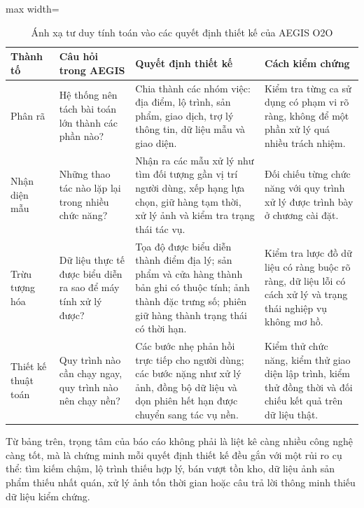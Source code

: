 \documentclass[12pt, a4paper]{article}
\begin{document}
\begin{table}[H]
\centering
\renewcommand{\arraystretch}{1.35}
\small
\begin{adjustbox}{max width=\textwidth}
\begin{tabular}{|>{\raggedright\arraybackslash}p{2.9cm}|>{\raggedright\arraybackslash}p{3.7cm}|>{\raggedright\arraybackslash}p{4.5cm}|>{\raggedright\arraybackslash}p{4.0cm}|}
\hline
\textbf{Thành tố} & \textbf{Câu hỏi trong AEGIS} & \textbf{Quyết định thiết kế} & \textbf{Cách kiểm chứng} \\ \hline
Phân rã & Hệ thống nên tách bài toán lớn thành các phần nào? & Chia thành các nhóm việc: địa điểm, lộ trình, sản phẩm, giao dịch, trợ lý thông tin, dữ liệu mẫu và giao diện. & Kiểm tra từng ca sử dụng có phạm vi rõ ràng, không để một phần xử lý quá nhiều trách nhiệm. \\ \hline
Nhận diện mẫu & Những thao tác nào lặp lại trong nhiều chức năng? & Nhận ra các mẫu xử lý như tìm đối tượng gần vị trí người dùng, xếp hạng lựa chọn, giữ hàng tạm thời, xử lý ảnh và kiểm tra trạng thái tác vụ. & Đối chiếu từng chức năng với quy trình xử lý được trình bày ở chương cài đặt. \\ \hline
Trừu tượng hóa & Dữ liệu thực tế được biểu diễn ra sao để máy tính xử lý được? & Tọa độ được biểu diễn thành điểm địa lý; sản phẩm và cửa hàng thành bản ghi có thuộc tính; ảnh thành đặc trưng số; phiên giữ hàng thành trạng thái có thời hạn. & Kiểm tra lược đồ dữ liệu có ràng buộc rõ ràng, dữ liệu lỗi có cách xử lý và trạng thái nghiệp vụ không mơ hồ. \\ \hline
Thiết kế thuật toán & Quy trình nào cần chạy ngay, quy trình nào nên chạy nền? & Các bước nhẹ phản hồi trực tiếp cho người dùng; các bước nặng như xử lý ảnh, đồng bộ dữ liệu và dọn phiên hết hạn được chuyển sang tác vụ nền. & Kiểm thử chức năng, kiểm thử giao diện lập trình, kiểm thử đồng thời và đối chiếu kết quả trên dữ liệu thật. \\ \hline
\end{tabular}
\end{adjustbox}
\caption{Ánh xạ tư duy tính toán vào các quyết định thiết kế của AEGIS O2O}
\label{tab:ct_mapping}
\end{table}

Từ bảng trên, trọng tâm của báo cáo không phải là liệt kê càng nhiều công nghệ càng tốt, mà là chứng minh mỗi quyết định thiết kế đều gắn với một rủi ro cụ thể: tìm kiếm chậm, lộ trình thiếu hợp lý, bán vượt tồn kho, dữ liệu ảnh sản phẩm thiếu nhất quán, xử lý ảnh tốn thời gian hoặc câu trả lời thông minh thiếu dữ liệu kiểm chứng.
\end{document}
